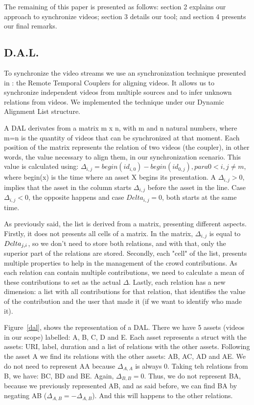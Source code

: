\documentclass{sig-alternate-05-2015}
\begin{document}
The remaining of this paper is presented as follows: section 2 explains our approach to synchronize videos; section 3 details our tool; and section 4 presents our final remarks.

\subsection{D.A.L.}
To synchronize the video streams we use an synchronization technique presented in \cite{segundo2015remote}: the Remote Temporal Couplers for aligning videos. It allows us to synchronize independent videos from multiple sources and to infer unknown relations from videos. We implemented the technique under our Dynamic Alignment List structure.

A DAL derivates from a matrix m x n, with m and n natural numbers, where m=n is the quantity of videos that can be synchronized at that moment. Each position of the matrix represents the relation of two videos (the coupler), in other words, the value necessary to align them, in our synchronization scenario. This value is calculated using: $\Delta_{i,j}=begin(id_{i,0})-begin(id_{0,j}), para 0<i,j\neq m $, where begin(x) is the time where an asset X begins its presentation. A $\Delta_{i,j} > 0$, implies that the asset in the column starts $\Delta_{i,j}$ before the asset in the line. Case $\Delta_{i,j} < 0$, the opposite happens and case $Delta_{i,j} = 0$, both starts at the same time.

As previously said, the list is derived from a matrix, presenting different aspects. Firstly, it does not presents all cells of a matrix. In the matrix, $\Delta_{i,j}$ is equal to $\-Delta_{j,i}$, so we don't need to store both relations, and with that, only the superior part of the relations are stored. Secondly, each "cell" of the list, presents multiple properties to help in the management of the crowd contributions. As each relation can contain multiple contributions, we need to calculate a mean of these contributions  to set as the actual $\Delta$. Lastly, each relation has a new dimension: a list with all contributions for that relation, that identifies the value of the contribution and the user that made it (if we want to identify who made it).

Figure~\ref{dal}, shows the representation of a DAL. There we have 5 assets (videos in our scope) labelled: A, B, C, D and E. Each asset represents a struct with the assets: URI, label, duration and a list of relations with the other assets. Following the asset A we find its relations with the other assets: AB, AC, AD and AE. We do not need to represent AA because $\Delta_{A,A}$ is always 0. Taking teh relations from B, we have: BC, BD and BE.  Again, $\Delta_{B,B} = 0$. Thus, we do not represent BA, because we previously represented AB, and as said before, we can find BA by negating AB ($\Delta_{A,B} = -\Delta_{A,B}$). And this will happens to the other relations.
\end{document}

